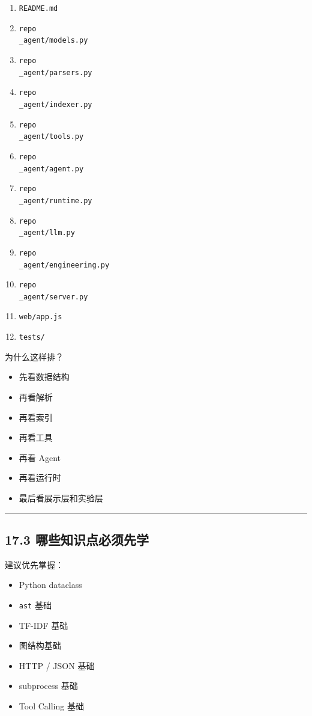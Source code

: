 \documentclass[UTF8,12pt,openany]{ctexbook}
\begin{document}
\begin{enumerate}
\item \texttt{README.md}
\item \texttt{repo\\_agent/models.py}
\item \texttt{repo\\_agent/parsers.py}
\item \texttt{repo\\_agent/indexer.py}
\item \texttt{repo\\_agent/tools.py}
\item \texttt{repo\\_agent/agent.py}
\item \texttt{repo\\_agent/runtime.py}
\item \texttt{repo\\_agent/llm.py}
\item \texttt{repo\\_agent/engineering.py}
\item \texttt{repo\\_agent/server.py}
\item \texttt{web/app.js}
\item \texttt{tests/}
\end{enumerate}

为什么这样排？\par

\begin{itemize}
\item 先看数据结构
\item 再看解析
\item 再看索引
\item 再看工具
\item 再看 Agent
\item 再看运行时
\item 最后看展示层和实验层
\end{itemize}

\hrule

\subsection{17.3 哪些知识点必须先学}

建议优先掌握：\par

\begin{itemize}
\item Python dataclass
\item \texttt{ast} 基础
\item TF-IDF 基础
\item 图结构基础
\item HTTP / JSON 基础
\item subprocess 基础
\item Tool Calling 基础
\end{itemize}
\end{document}
